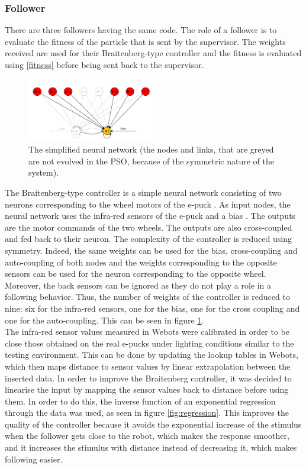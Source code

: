 \documentclass[a4paper, 10pt, conference]{ieeeconf}      %
\begin{document}
\subsubsection{Follower}
There are three followers having the same code. The role of a follower is to evaluate the fitness of the particle that is sent by the supervisor. The weights received are used for their Braitenberg-type controller and the fitness is evaluated using \ref{fitness} before being sent back to the supervisor.

\begin{figure}[thpb]
      \centering
      \includegraphics[width = 0.5\textwidth]{images/NNsimplified.png}
      \caption{The simplified neural network (the nodes and links, that are greyed are not evolved in the PSO, because of the symmetric nature of the system).}
      \label{fig:nnsimplified}
\end{figure}

The Braitenberg-type controller is a simple neural network consisting of two neurons corresponding to the wheel motors of the e-puck \cite{c4}. As input nodes, the neural network uses the infra-red sensors of the e-puck  and a bias \cite{c3}. The outputs are the motor commands of the two wheels. The outputs are also cross-coupled and fed back to their neuron. The complexity of the controller is reduced using symmetry. Indeed, the same weights can be used for the bias, cross-coupling and auto-coupling of both nodes and the weights corresponding to the opposite sensors can be used for the neuron corresponding to the opposite wheel. Moreover, the back sensors can be ignored as they do not play a role in a following behavior. Thus, the number of weights of the controller is reduced to nine: six for the infra-red sensors, one for the bias, one for the cross coupling and one for the auto-coupling. This can be seen in figure \ref{fig:nnsimplified}.\\
The infra-red sensor values measured in Webots were calibrated in order to be close those obtained on the real e-pucks under lighting conditions similar to the testing environment. This can be done by updating the lookup tables in Webots, which then maps distance to sensor values by linear extrapolation between the inserted data. In order to improve the Braitenberg controller, it was decided to linearise the input by mapping the sensor values back to distance before using them. In order to do this, the inverse function of an exponential regression through the data was used, as seen in figure \ref{fig:regression}. This improves the quality of the controller because it avoids the exponential increase of the stimulus when the follower gets close to the robot, which makes the response smoother, and it increases the stimulus with distance instead of decreasing it, which makes following easier.\\
\end{document}
